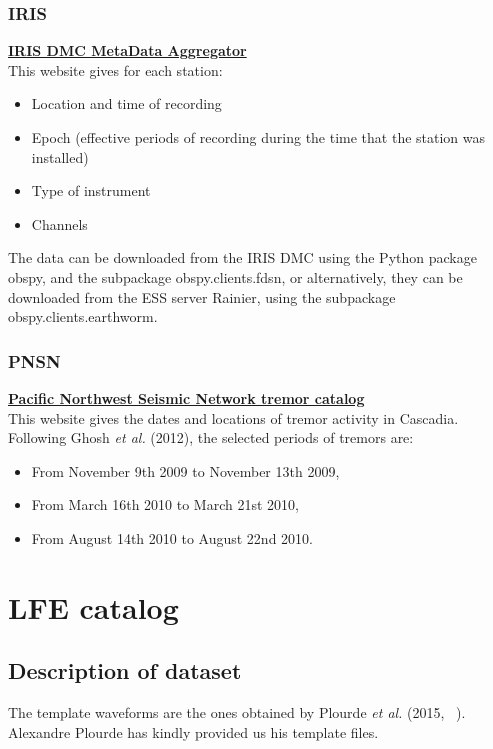 \documentclass[main.tex]{subfiles}
\begin{document}
\subsection{IRIS}

\href{http://ds.iris.edu/mda}{\textbf{IRIS DMC MetaData Aggregator}} \\

This website gives for each station:
\begin{itemize}
	\item Location and time of recording
	\item Epoch (effective periods of recording during the time that the station was installed)
	\item Type of instrument
	\item Channels
\end{itemize}

The data can be downloaded from the IRIS DMC using the Python package obspy, and the subpackage obspy.clients.fdsn, or alternatively, they can be downloaded from the ESS server Rainier, using the subpackage obspy.clients.earthworm.

\subsection{PNSN}

\href{https://www.pnsn.org/tremor}{\textbf{Pacific Northwest Seismic Network tremor catalog}} \\

This website gives the dates and locations of tremor activity in Cascadia. Following Ghosh \textit{et al.} (2012), the selected periods of tremors are:
\begin{itemize}
	\item From November 9th 2009 to November 13th 2009,
	\item From March 16th 2010 to March 21st 2010,
	\item From August 14th 2010 to August 22nd 2010.
\end{itemize}

\chapter{LFE catalog}

\section{Description of dataset}

The template waveforms are the ones obtained by Plourde \textit{et al.} (2015, ~\cite{PLO_2015}). Alexandre Plourde has kindly provided us his template files. \\
\end{document}
